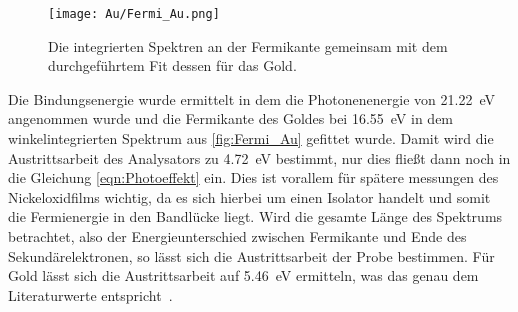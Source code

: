         \begin{figure}
            \centering
            \texttt{[image: Au/Fermi\_Au.png]}
            \caption{Die integrierten Spektren an der Fermikante gemeinsam mit dem durchgeführtem Fit dessen für das Gold.}
            \label{fig:Fermi_Au}
        \end{figure}
        Die Bindungsenergie wurde ermittelt in dem die Photonenenergie von \SI{21.22}{\electronvolt} angenommen wurde und die Fermikante des Goldes bei \SI{16.55}{\electronvolt} in dem winkelintegrierten Spektrum aus \autoref{fig:Fermi_Au} gefittet wurde.
        Damit wird die Austrittsarbeit des Analysators zu \SI{4.72}{\electronvolt} bestimmt, nur dies fließt dann noch in die Gleichung \ref{eqn:Photoeffekt} ein.
        Dies ist vorallem für spätere messungen des Nickeloxidfilms wichtig, da es sich hierbei um einen Isolator handelt und somit die Fermienergie in den Bandlücke liegt.
        Wird die gesamte Länge des Spektrums betrachtet, also der Energieunterschied zwischen Fermikante und Ende des Sekundärelektronen, so lässt sich die Austrittsarbeit der Probe bestimmen.
        Für Gold lässt sich die Austrittsarbeit auf \SI{5.46}{\electronvolt} ermitteln, was das genau dem Literaturwerte entspricht~\cite{5A_4}.

        
